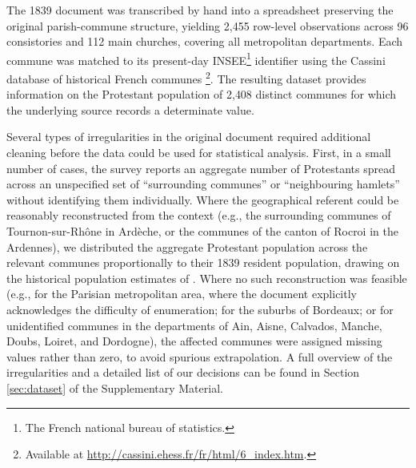 \documentclass[12pt]{article}
\begin{document}
The 1839 document was transcribed by hand into a spreadsheet preserving the original parish-commune structure, yielding 2{,}455 row-level observations across 96 consistories and 112 main churches, covering all metropolitan departments. Each commune was matched to its present-day INSEE\footnote{The French national bureau of statistics.} identifier using the Cassini database of historical French communes \parencite{LecfcfrNewArticles}\footnote{Available at \url{http://cassini.ehess.fr/fr/html/6_index.htm}.}. The resulting dataset provides information on the Protestant population of 2{,}408 distinct communes for which the underlying source records a determinate value.

Several types of irregularities in the original document required additional cleaning before the data could be used for statistical analysis. First, in a small number of cases, the survey reports an aggregate number of Protestants spread across an unspecified set of ``surrounding communes'' or ``neighbouring hamlets'' without identifying them individually. Where the geographical referent could be reasonably reconstructed from the context (e.g., the surrounding communes of Tournon-sur-Rhône in Ardèche, or the communes of the canton of Rocroi in the Ardennes), we distributed the aggregate Protestant population across the relevant communes proportionally to their 1839 resident population, drawing on the historical population estimates of \textcite{cageHistoryPoliticalConflict2025}. Where no such reconstruction was feasible (e.g., for the Parisian metropolitan area, where the document explicitly acknowledges the difficulty of enumeration; for the suburbs of Bordeaux; or for unidentified communes in the departments of Ain, Aisne, Calvados, Manche, Doubs, Loiret, and Dordogne), the affected communes were assigned missing values rather than zero, to avoid spurious extrapolation. A full overview of the irregularities and a detailed list of our decisions can be found in Section \ref{sec:dataset} of the Supplementary Material. 
\end{document}
